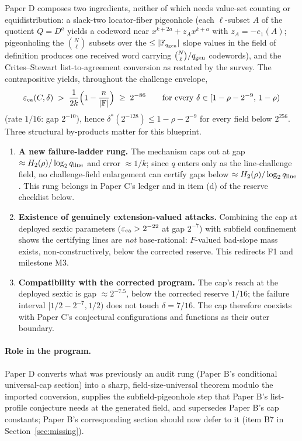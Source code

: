 \documentclass[11pt]{article}
\theoremstyle{definition}
\theoremstyle{remark}
\newcommand{\F}{\mathbb F}
\newcommand{\eca}{\varepsilon_{\rm ca}}
\newcommand{\qgen}{q_{\rm gen}}
\newcommand{\qline}{q_{\rm line}}
\newcommand{\paperB}{Paper B}
\newcommand{\paperC}{Paper C}
\newcommand{\paperD}{Paper D}
\begin{document}
\paperD{} composes two ingredients, neither of which needs value-set counting or equidistribution: a slack-two locator-fiber pigeonhole (each $\ell$-subset $A$ of the quotient $Q=D^{a}$ yields a codeword near $x^{k+2a}+z_Ax^{k+a}$ with $z_A=-e_1(A)$; pigeonholing the $\binom N\ell$ subsets over the $\le|\F_{\qgen}|$ slope values in the field of definition produces one received word carrying $\binom N\ell/\qgen$ codewords), and the Crites--Stewart list-to-agreement conversion as restated by the survey.  The contrapositive yields, throughout the challenge envelope,
\[
        \eca(C,\delta)\;>\;\frac1{2k}\Bigl(1-\frac n{|\F|}\Bigr)\;\ge\;2^{-86}
        \qquad\text{for every }\delta\in[1-\rho-2^{-9},\,1-\rho)
\]
(rate $1/16$: gap $2^{-10}$), hence $\delta^*(2^{-128})\le1-\rho-2^{-9}$ for every field below $2^{256}$.  Three structural by-products matter for this blueprint.
\begin{enumerate}[leftmargin=2.2em]
\item \textbf{A new failure-ladder rung.}  The mechanism caps out at gap $\approx H_2(\rho)/\log_2\qline$ and error $\approx1/k$; since $q$ enters only as the line-challenge field, no challenge-field enlargement can certify gaps below $\approx H_2(\rho)/\log_2\qline$.  This rung belongs in \paperC's ledger and in item (d) of the reserve checklist below.
\item \textbf{Existence of genuinely extension-valued attacks.}  Combining the cap at deployed sextic parameters ($\eca>2^{-22}$ at gap $2^{-7}$) with subfield confinement shows the certifying lines are \emph{not} base-rational: $F$-valued bad-slope mass exists, non-constructively, below the corrected reserve.  This redirects F1 and milestone M3.
\item \textbf{Compatibility with the corrected program.}  The cap's reach at the deployed sextic is gap $\approx2^{-7.5}$, below the corrected reserve $1/16$; the failure interval $[1/2-2^{-7},1/2)$ does not touch $\delta=7/16$.  The cap therefore coexists with \paperC's conjectural configurations and functions as their outer boundary.
\end{enumerate}

\paragraph{Role in the program.}  \paperD{} converts what was previously an audit rung (\paperB's conditional universal-cap section) into a sharp, field-size-universal theorem modulo the imported conversion, supplies the subfield-pigeonhole step that \paperB's list-profile conjecture needs at the generated field, and supersedes \paperB's cap constants; \paperB's corresponding section should now defer to it (item B7 in Section~\ref{sec:missing}).
\end{document}
